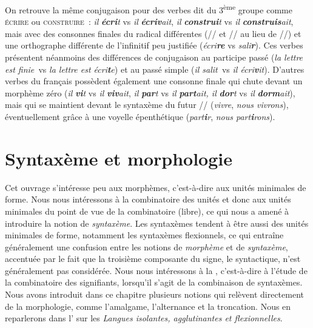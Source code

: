 {    On retrouve la même conjugaison pour des verbes dit du 3\textsuperscript{ème} groupe comme \textsc{écrire} ou \textsc{construire~}: \textit{il} \textbf{\textit{écri}}\textit{t} vs \textit{il} \textbf{\textit{écriv}}\textit{ait}, \textit{il} \textbf{\textit{construi}}\textit{t} vs \textit{il} \textbf{\textit{construis}}\textit{ait}, mais avec des consonnes finales du radical différentes (// et // au lieu de //) et une orthographe différente de l’infinitif peu justifiée (\textit{écri}\textbf{\textit{re}} vs \textit{sali}\textbf{\textit{r}}). Ces verbes présentent néanmoins des différences de conjugaison au participe passé (\textit{la lettre est finie~}vs \textit{la lettre est écri}\textbf{\textit{t}}\textit{e}) et au passé simple (\textit{il salit~}vs \textit{il écri}\textbf{\textit{v}}\textit{it}). D’autres verbes du français possèdent également une consonne finale qui chute devant un morphème zéro (\textit{il} \textbf{\textit{vi}}\textit{t} vs \textit{il} \textbf{\textit{viv}}\textit{ait}, \textit{il} \textbf{\textit{par}}\textit{t} vs \textit{il} \textbf{\textit{part}}\textit{ait, il} \textbf{\textit{dor}}\textit{t} vs \textit{il} \textbf{\textit{dorm}}\textit{ait}), mais qui se maintient devant le syntaxème du futur \textstylePhonoApprofondissement{{}-}//\textstylePhonoApprofondissement{{}-} (\textit{vivre}, \textit{nous vivrons}), éventuellement grâce à une voyelle épenthétique (\textit{part}\textbf{\textit{i}}\textit{r}, \textit{nous part}\textbf{\textit{i}}\textit{rons}).
}
\section{Syntaxème et morphologie}\label{sec:2.2.26}

Cet ouvrage s’intéresse peu aux morphèmes, c’est-à-dire aux unités minimales de forme. Nous nous intéressons à la combinatoire des unités et donc aux unités minimales du point de vue de la combinatoire (libre), ce qui nous a amené à introduire la notion de \textit{syntaxème}. Les syntaxèmes tendent à être aussi des unités minimales de forme, notamment les syntaxèmes flexionnels, ce qui entraîne généralement une confusion entre les notions de \textit{morphème} et de \textit{syntaxème}, accentuée par le fait que la troisième composante du signe, le syntactique, n’est généralement pas considérée. Nous nous intéressons à la , c’est-à-dire à l’étude de la combinatoire des signifiants, lorsqu’il s’agit de la combinaison de syntaxèmes. Nous avons introduit dans ce chapitre plusieurs notions qui relèvent directement de la morphologie, comme l’amalgame, l’alternance et la troncation. Nous en reparlerons dans l’ sur les \textit{Langues isolantes, agglutinantes et flexionnelles}.

